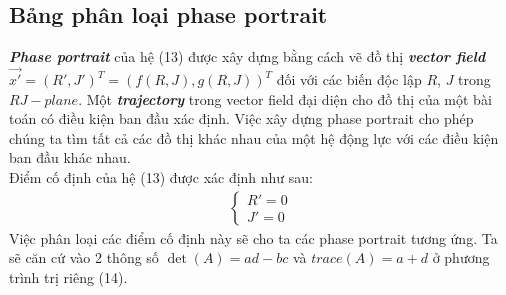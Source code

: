 \subsection{Bảng phân loại phase portrait}
\textbf{\textit{Phase portrait}} của hệ (13) được xây dựng bằng cách vẽ đồ thị \textbf{\textit{vector field}} $\Vec{x'}=(R',J')^T=(f(R,J),g(R,J))^T$ đối với các biến độc lập $R$, $J$ trong $RJ-plane$. Một \textbf{\textit{trajectory}} trong vector field đại diện cho đồ thị của một bài toán có điều kiện ban đầu xác định. Việc xây dựng phase portrait cho phép chúng ta tìm tất cả các đồ thị khác nhau của một hệ động lực với các điều kiện ban đầu khác nhau.\\
Điểm cố định của hệ (13) được xác định như sau:
\begin{align*}
    \begin{cases}
        R'=0\\
        J'=0
    \end{cases}
\end{align*}
Việc phân loại các điểm cố định này sẽ cho ta các phase portrait tương ứng. Ta sẽ căn cứ vào 2 thông số $\det(A)=ad-bc$ và $trace(A)=a+d$ ở phương trình trị riêng (14).
